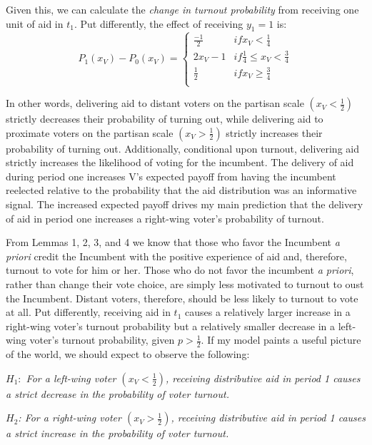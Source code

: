 \documentclass[12pt]{paper}
\begin{document}
Given this, we can calculate the \emph{change in turnout probability} from receiving one unit of aid in $t_1$. Put differently, the effect of receiving $y_1 = 1$ is:
\begin{equation}
P_1 (x_V ) - P_0 (x_V )=
\begin{cases}
\frac{-1}{2} & if x_V < \frac{1}{4}\\    
2x_V - 1 & if \frac{1}{4} \leq x_V < \frac{3}{4}  \\
\frac{1}{2} & if x_V \geq \frac{3}{4}  \\
\end{cases}
\end{equation}

In other words, delivering aid to distant voters on the partisan scale $(x_V < \frac{1}{2})$ strictly decreases their probability of turning out, while delivering aid to proximate voters on the partisan scale $(x_V > \frac{1}{2})$  strictly increases their probability of turning out. Additionally, conditional upon turnout, delivering aid strictly increases the likelihood of voting for the incumbent. The delivery of aid during period one increases V’s expected payoff from having the incumbent reelected relative to the probability that the aid distribution was an informative signal. The increased expected payoff drives my main prediction that the delivery of aid in period one increases a right-wing voter's probability of turnout.

From Lemmas 1, 2, 3, and 4 we know that those who favor the Incumbent \emph{a priori} credit the Incumbent with the positive experience of aid and, therefore, turnout to vote for him or her. Those who do not favor the incumbent \emph{a priori}, rather than change their vote choice, are simply less motivated to turnout to oust the Incumbent. Distant voters, therefore, should be less likely to turnout to vote at all. Put differently, receiving aid in $t_1$ causes a relatively larger increase in a right-wing voter’s turnout probability but a relatively smaller decrease in a left-wing voter’s turnout probability, given $p > \frac{1}{2}$. If my model paints a useful picture of the world, we should expect to observe the following:

\emph{$H_1:$ For a left-wing voter $(x_V < \frac{1}{2})$, receiving distributive aid in period 1 causes a strict decrease in the probability of voter turnout.}

\emph{$H_2$: For a right-wing voter $(x_V > \frac{1}{2})$, receiving distributive aid in period 1 causes a strict increase in the probability of voter turnout.}
\end{document}
